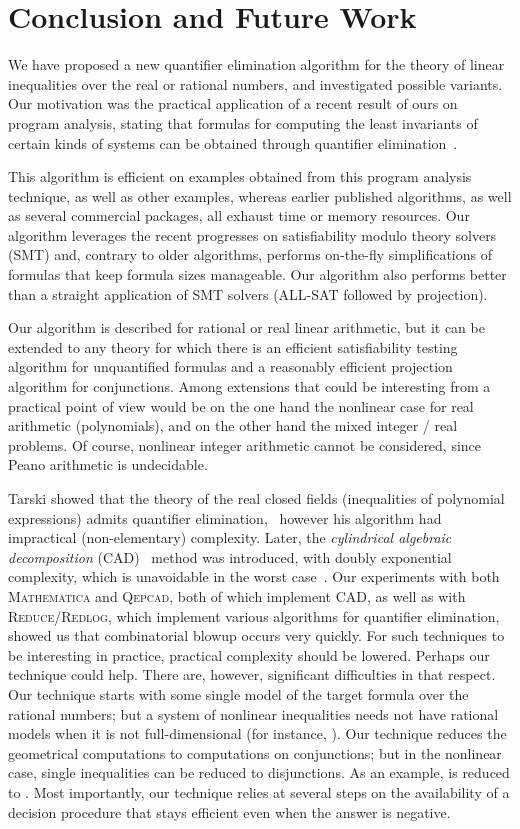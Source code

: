 \section{Conclusion and Future Work}
We have proposed a new quantifier elimination algorithm for the theory of linear inequalities over the real or rational numbers, and investigated possible variants. Our motivation was the practical application of a recent result of ours on program analysis, stating that formulas for computing the least invariants of certain kinds of systems can be obtained through quantifier elimination~\cite{Monniaux_SAS07}.

This algorithm is efficient on examples obtained from this program analysis technique, as well as other examples, whereas earlier published algorithms, as well as several commercial packages, all exhaust time or memory resources. Our algorithm leverages the recent progresses on satisfiability modulo theory solvers (SMT) and, contrary to older algorithms, performs on-the-fly simplifications of formulas that keep formula sizes manageable. Our algorithm also performs better than a straight application of SMT solvers (ALL-SAT followed by projection).

Our algorithm is described for rational or real linear arithmetic, but it can be extended to any theory for which there is an efficient satisfiability testing algorithm for unquantified formulas and a reasonably efficient projection algorithm for conjunctions. Among extensions that could be interesting from a practical point of view would be on the one hand the nonlinear case for real arithmetic (polynomials), and on the other hand the mixed integer / real problems. Of course, nonlinear integer arithmetic cannot be considered, since Peano arithmetic is undecidable.

Tarski showed that the theory of the real closed fields (inequalities of polynomial expressions) admits quantifier elimination,~\cite{Tarski51} however his algorithm had impractical (non-elementary) complexity. Later, the \emph{cylindrical algebraic decomposition} (CAD)~\cite[Ch.~11]{Basu_Pollack_Roy_2003} method was introduced, with doubly exponential complexity, which is unavoidable in the worst case~\cite[\S 11.4]{Basu_Pollack_Roy_2003}. Our experiments with both \textsc{Mathematica} and \textsc{Qepcad}, both of which implement CAD, as well as with \textsc{Reduce}/\textsc{Redlog}, which implement various algorithms for quantifier elimination, showed us that combinatorial blowup occurs very quickly. For such techniques to be interesting in practice, practical complexity should be lowered. Perhaps our technique could help. There are, however, significant difficulties in that respect. Our technique starts with some single model of the target formula over the rational numbers; but a system of nonlinear inequalities needs not have rational models when it is not full-dimensional (for instance, ). Our technique reduces the geometrical computations to computations on conjunctions; but in the nonlinear case, single inequalities can be reduced to disjunctions. As an example,  is reduced to . Most importantly, our technique relies at several steps on the availability of a decision procedure that stays efficient even when the answer is negative.

